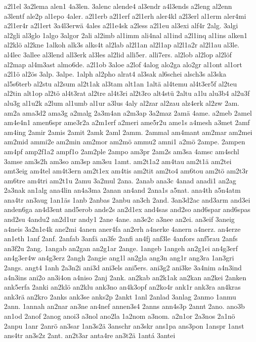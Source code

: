 {a2l1el
3a2lema
alen1
4a3len.
3alenc
alende4
al3endr
a4l3ends
a2leng
al2enn
a3lentf
ale2p
al1epo
4aler.
a2l1erb
a2l1erf
a2l1erh
aler4kl
a2l3erl
al1erm
aler4mi
a2l1er4r
a2l1ert
3a4l3erwä
4ales
a2l1e4sk
a2less
a2l1eu
al3exi
alf4r
2alg.
3algi
al2gli
al3glo
1algo
3algor
2ali
al2imb
al1imm
ali4nal
al1ind
a2l1inq
al1ins
alken1
al2klö
al2kne
1alkoh
alk3s
alks4t
al2lab
al2l1an
al2l1ap
al2l1a2r
al2l1au
al3le.
al4lec
3allee
al3lend
all3erk
al3les
al2lid
alli5er.
alli7ers.
al2lob
al2lop
al2löf
al2map
al4m3ast
almo6de.
a2l1ob
3aloe
a2lof
4alog
alo2ga
alo2gr
al1ont
al1ort
a2l1ö
al2ös
3alp.
3alpe.
1alph
al2pho
alrat4
al3sak
al6schei
alsch3s
al3ska
al5s6terb
al2stu
al2sum
al2t1ak
al3tam
alt1an
1altä
al4temu
al4t3er5f
al2teu
al2tin
alt1op
al2tö
al4t3rat
al2tre
al4t3ri
al2t3ro
alt4stü
2altu
a1lu
alu3b4
al2u3f
alu3g
al1u2k
a2lum
al1umb
al1ur
a3lus
4aly
al2zar
al2zau
alz4erk
al2zw
2am.
am2a
ama3d2
ama3g
a2malg
2a3m4an
a2m3ap
3a2maz
2amä
4ame.
a2meb
2amel
am4e4n1
amen6spr
ame3r2a
a2m1erf
a2meri
ame5r2u
ame1s
a4mesh
a3met
2amf
am4ing
2amir
2amis
2amit
2amk
2aml
2amm.
2ammal
am4mant
am2mar
am2mei
am2mid
ammi2e
am2min
am2mor
am2mö
ammu2
amni1
a2mö
2ampe.
2ampen
am4pf
amp2f1a2
ampf1o
2am2ple
2ampo
am3pr
2am2s
am3sa
4amsc
am4schl
3amse
am3s2h
am3so
am3sp
am3su
1amt.
am2t1a2
am4tau
am2t1ä
am2tei
amt3eig
am4tel
am4t3ern
am2t1ex
am4tis
am2tit
am2to4
am6tou
am2tö
am2t3r
am6tre
am4tri
am2t1u
2amu
3a2mul
2ana.
2anab
ana3c
4anad
anadi1
an2ag
2a3nak
an1alg
ana4lin
an4a3ma
2anan
an4and
2ana1s
a5nat.
ana4th
a5n4atm
ana4tr
an3aug
1an1äs
1anb
2anbas
2anbu
an3ch
2and.
3an3d2ac
and3arm
and3ei
anden6ga
an4d3ent
and5erob
ande2s
an2d1ex
and4sas
and2so
and6spar
and6spas
and2su
4andu2
an2d1ur
andy1
2ane
4ane.
an3e2c
a3nee
an2ei.
an3eif
3aneig
a4neis
3a2n1e4k
ane2mi
4anen
aner4fa
an2erh
a4nerke
4anern
a4nerz.
an4erze
an1eth
1anf
2anf.
2anfab
3anfä
an3fe
2anfi
an4fj
anf3le
4anfors
anf5rau
2anfs
an3f2u
2ang.
1angab
an2gan
an2g1ar
2ange.
1angeb
1angeh
an2g1ei
an4g3erf
an4g3er4w
an4g3erz
2angh
2angie
ang1l
an2gla
ang3n
ang1r
ang3ra
1an3gri
2angs.
angt4
1anh
2a3n2i
ani3d
ani3els
ani5ers.
ani3g2
ani3ke
3a4nim
a4n3ind
a4n3ins
ani2o
an3i4on
a4niso
2anj
2ank.
an2kab
an2k1ak
an2kan
an2kei
2anken
ank5erfa
2anki
an2klö
an2klu
ank3no
an4k3opf
an2ko4r
ank1r
ank3ra
an4kras
ank3rä
an2kro
2anks
ank3se
anks2p
2ankt
1anl
2anlad
3anlag
2anmo
1anmu
2ann.
1annah
an2nar
an3ne
an4nef
annen3s4
2anns
ann4s3p
2annt
2ano.
ano3b
an1od
2anof
2anog
anoi3
a3nol
ano2la
1a2nom
a3nom.
a2n1or
2a3nos
2a1nö
2anpu
1anr
2anrö
an3sar
1an3s2ä
3anschr
an3skr
ans1pa
ans3pon
1anspr
1anst
ans4tr
an3s2z
2ant.
an2t3ar
anta4re
an3t2ä
1antá
3antei
}
